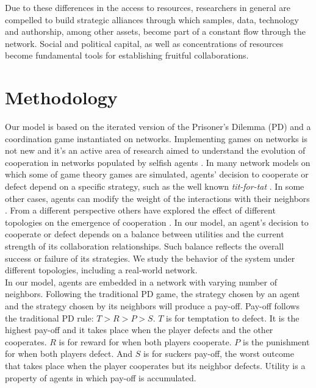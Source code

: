 \documentclass{bmcart}
\begin{document}
Due to these differences in the access to resources, researchers in
general are compelled to build strategic alliances through which samples, data,
technology and authorship, among other assets, become part of a constant flow through
the network. Social and political capital, as well as concentrations of
resources become fundamental tools for establishing fruitful collaborations. 

\section*{Methodology}


Our model is based on the iterated version of the Prisoner's Dilemma (PD) and a
coordination game instantiated on
networks. Implementing games on networks is not new and it's an active area of
research aimed to understand the evolution of cooperation in networks populated
by selfish agents \cite{SzaboFath:2007,Nowak-etal:92,OshtukiNowak:2006,Santos-etal:2005,Santos-etal:2006}. In many network models
on which some of game theory games are simulated, agents' decision to cooperate
or defect depend on a specific strategy, such as the well known
\textit{tit-for-tat} \cite{Axelrod:2006,Nowak-etal:2011}. In some other cases, agents
can modify the weight of the interactions with their neighbors
\cite{Santos-etal:2006}. From a different perspective others have explored the effect
of different topologies on the emergence of cooperation
\cite{Santos-etal:2005,HauertDoebeli:2004}. In our model, an agent's decision to
cooperate or defect depends on a balance between
utilities and the current strength of its collaboration relationships. Such
balance reflects the overall success or failure of its strategies. We
study the behavior of the system under different topologies, including a
real-world network.\\  


In our model, agents are embedded in a network with varying number of
neighbors. Following the traditional PD game, the strategy chosen by an agent
and the strategy chosen by its neighbors will produce a pay-off. Pay-off follows
the traditional PD rule: $T > R > P > S$. $T$ is for temptation to defect. It is the highest
pay-off and it takes place when the player defects and the other cooperates. $R$
is for reward for when both players cooperate. $P$ is the punishment for when
both players defect. And $S$ is for suckers pay-off, the worst outcome that
takes place when the player cooperates but its neighbor defects. Utility is a
property of agents in which pay-off is accumulated.\\   
\end{document}
